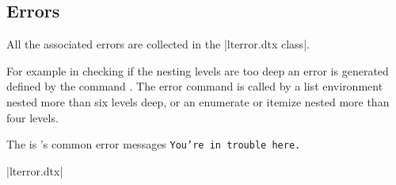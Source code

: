 \subsection*{Errors}
All the associated errors are collected in the |lterror.dtx class|.

For example in checking if the nesting levels are too deep an error is generated defined by the command . The error command is called by a list environment nested more than six levels deep, or an enumerate or itemize nested more than four levels.

\begin{teX}
 \gdef\@toodeep{%
 \@ehd}
 \@autoerr\@toodeep}
\end{teX}

\noindent The  is \latex's common error messages \texttt{You're in trouble here.}

\begin{teX}
\gdef\@ehd{%
 You're in trouble here. \space\@ehc}
\end{teX}

|lterror.dtx|













